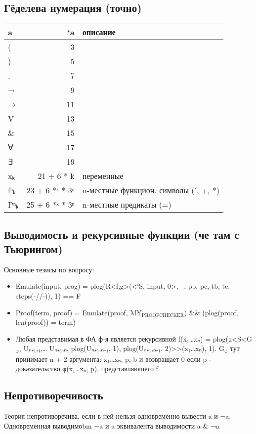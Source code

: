 \documentclass[11pt]{article}
\begin{document}
\subsection{Гёделева нумерация (точно)}
\label{sec-2-29}
\begin{center}
\begin{tabular}{lrl}
a & `a & описание\\
\hline
( & 3 & \\
) & 5 & \\
, & 7 & \\
¬ & 9 & \\
→ & 11 & \\
V & 13 & \\
\& & 15 & \\
∀ & 17 & \\
∃ & 19 & \\
xₖ & 21 + 6 * k & переменные\\
fⁿₖ & 23 + 6 *ᵏ * 3ⁿ & n-местные функцион. символы (', +, *)\\
Pⁿₖ & 25 + 6 *ᵏ * 3ⁿ & n-местные предикаты (=)\\
\hline
\end{tabular}
\end{center}

\subsection{Выводимость и рекурсивные функции (че там с Тьюрингом)}
\label{sec-2-30}
Основные тезисы по вопросу:
\begin{itemize}
\item Emulate(input, prog) = plog(R<f,g>(<`S, input, 0>,  , pb, pc, tb, tc, steps(-//-)), 1) == F
\item Proof(term, proof) = Emulate(proof, MY$_{\text{PROOFCHECKER}}$) \&\& (plog(proof, len(proof)) = term)
\item Любая представимая в ФА ф-я является рекурсивной
f(x₁\ldots{}xₙ) = plog(μ<S<G$_{\text{φ}}$, Uₙ₊₁,₁,\ldots{} Uₙ₊₁,ₙ,
plog(Uₙ₊₁,ₙ₊₁, 1),
plog(Uₙ₊₁,ₙ₊₁, 2)>>(x₁\ldots{}xₙ), 1).
G$_{\text{φ}}$ тут принимает n + 2 аргумента: x₁\ldots{}xₙ, p, b и возвращает 0 если
p - доказательство φ(x₁\ldots{}xₙ, p), представляющего f.
\end{itemize}
\subsection{Непротиворечивость}
\label{sec-2-31}
Теория непротиворечива, если в ней нельзя одновременно
вывести a и ¬a.
Одновременная выводимоbm ¬a и a эквивалента выводимости
a \& ¬a
\end{document}
